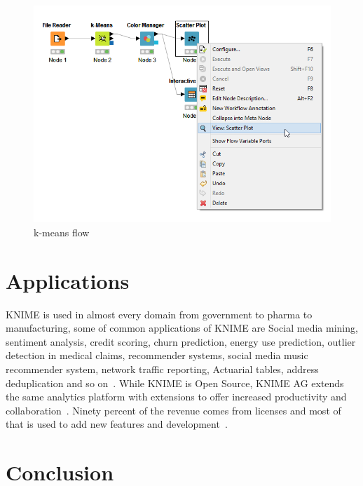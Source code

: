\begin{figure}[!ht]
	\centering\includegraphics[width=\columnwidth]{../images/kmeans_flow.png}
	\caption{k-means flow~\cite{hid-sp18-517-wf}}
 	\label{fig:kmean}
\end{figure}


\section{Applications}

KNIME is used in almost every domain from government to pharma to manufacturing,
some of common applications of KNIME are Social media mining, sentiment
analysis, credit scoring, churn prediction, energy use prediction, outlier detection in medical
claims, recommender systems, social media music recommender system, network traffic 
reporting, Actuarial tables, address deduplication and so on~\cite{hid-sp18-517-applications}.  
While KNIME is Open Source, KNIME AG extends the same analytics platform with extensions to offer increased
productivity and collaboration~\cite{hid-sp18-517-opensource}.  Ninety percent
of the revenue comes from licenses and most of that is used to add new features
and development~\cite{hid-sp18-517-opensource}.

\section{Conclusion}

